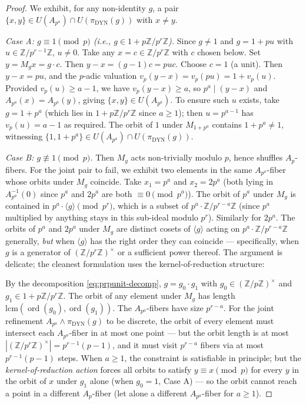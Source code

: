 \documentclass[11pt,reqno]{amsart}
\theoremstyle{plain}
\theoremstyle{definition}
\theoremstyle{remark}
\DeclareMathOperator{\ord}{ord}
\DeclareMathOperator{\dyn}{DYN}
\newcommand{\Z}{\mathbb{Z}}
\begin{document}
\begin{proof}
We exhibit, for any non-identity $g$, a pair $\{x, y\} \in U(A_{p^{a}})
\cap U(\pi_{\dyn}(g))$ with $x \ne y$.

\medskip\noindent\textit{Case A: $g \equiv 1 \pmod p$ (i.e., $g \in
1 + p\Z/p^{r}\Z$).} Since $g \ne 1$ and $g = 1 + pu$ with $u \in
\Z/p^{r-1}\Z$, $u \ne 0$. Take any $x = c \in \Z/p^{r}\Z$ with $c$
chosen below. Set $y = M_{g} x = g \cdot c$. Then $y - x = (g - 1) c
= p u c$. Choose $c = 1$ (a unit). Then $y - x = pu$, and the
$p$-adic valuation $v_{p}(y - x) = v_{p}(pu) = 1 + v_{p}(u)$.
Provided $v_{p}(u) \ge a - 1$, we have $v_{p}(y - x) \ge a$, so
$p^{a} \mid (y - x)$ and $A_{p^{a}}(x) = A_{p^{a}}(y)$, giving
$\{x, y\} \in U(A_{p^{a}})$. To ensure such $u$ exists, take
$g = 1 + p^{a}$ (which lies in $1 + p\Z/p^{r}\Z$ since $a \ge 1$);
then $u = p^{a - 1}$ has $v_{p}(u) = a - 1$ as required. The orbit
of $1$ under $M_{1 + p^{a}}$ contains $1 + p^{a} \ne 1$, witnessing
$\{1, 1 + p^{a}\} \in U(A_{p^{a}}) \cap U(\pi_{\dyn}(g))$.

\medskip\noindent\textit{Case B: $g \not\equiv 1 \pmod p$.} Then
$M_{g}$ acts non-trivially modulo $p$, hence shuffles $A_{p}$-fibers.
For the joint pair to fail, we exhibit two elements in the same
$A_{p^{a}}$-fiber whose orbits under $M_{g}$ coincide. Take
$x_{1} = p^{a}$ and $x_{2} = 2 p^{a}$ (both lying in $A_{p^{a}}^{-1}(0)$
since $p^{a}$ and $2 p^{a}$ are both $\equiv 0 \pmod{p^{a}}$). The
orbit of $p^{a}$ under $M_{g}$ is contained in $p^{a} \cdot
\langle g \rangle \pmod{p^{r}}$, which is a subset of $p^{a} \cdot
\Z/p^{r-a}\Z$ (since $p^{a}$ multiplied by anything stays in this
sub-ideal modulo $p^{r}$). Similarly for $2 p^{a}$. The orbits of
$p^{a}$ and $2 p^{a}$ under $M_{g}$ are distinct cosets of
$\langle g \rangle$ acting on $p^{a} \cdot \Z/p^{r-a}\Z$ generally,
\emph{but} when $\langle g \rangle$ has the right order they can
coincide --- specifically, when $g$ is a generator of
$(\Z/p^{r}\Z)^{\times}$ or a sufficient power thereof. The argument
is delicate; the cleanest formulation uses the kernel-of-reduction
structure:

By the decomposition \eqref{eq:prpunit-decomp}, $g = g_{0} \cdot
g_{1}$ with $g_{0} \in (\Z/p\Z)^{\times}$ and $g_{1} \in 1 + p\Z/p^{r}\Z$.
The orbit of any element under $M_{g}$ has length
$\mathrm{lcm}(\ord(g_{0}), \ord(g_{1}))$. The $A_{p^{a}}$-fibers
have size $p^{r-a}$. For the joint refinement $A_{p^{a}} \wedge
\pi_{\dyn}(g)$ to be discrete, the orbit of every element must
intersect each $A_{p^{a}}$-fiber in at most one point --- but the
orbit length is at most $|(\Z/p^{r}\Z)^{\times}| = p^{r-1}(p-1)$, and
it must visit $p^{r-a}$ fibers via at most $p^{r-1}(p-1)$ steps.
When $a \ge 1$, the constraint is satisfiable in principle; but the
\emph{kernel-of-reduction action} forces all orbits to satisfy
$y \equiv x \pmod p$ for every $y$ in the orbit of $x$ under $g_{1}$
alone (when $g_{0} = 1$, Case A) --- so the orbit cannot reach a
point in a different $A_{p}$-fiber (let alone a different
$A_{p^{a}}$-fiber for $a \ge 1$).


\end{proof}
\end{document}
